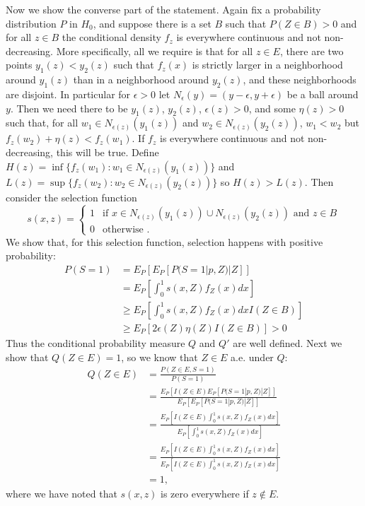 \documentclass{article}
\begin{document}
\begin{appendix}
Now we show the converse part of the statement. Again fix a probability distribution $P$ in $H_0$, and suppose there is a set $B$ such that $P(Z \in B)> 0$ and for all $z \in B$ the conditional density $f_{z}$ is everywhere continuous and not non-decreasing. More specifically, all we require is that for all $z\in E$, there are two points $y_1(z) < y_2(z)$ such that $f_{z}(x)$ is strictly larger in a neighborhood around $y_1(z)$ than in a neighborhood around $y_2(z)$, and these neighborhoods are disjoint. In particular for $\epsilon > 0$ let $N_{\epsilon}(y) = (y - \epsilon, y + \epsilon )$ be a ball around $y$. Then we need there to be $y_1(z)$, $y_2(z)$, $\epsilon(z) > 0$, and some $\eta(z) > 0$ such that, for all $w_1 \in N_{\epsilon(z)}(y_1(z))$ and $w_2 \in N_{\epsilon(z)}(y_2(z))$, $w_1  < w_2$ but $f_{z}(w_2) + \eta(z) < f_{z}(w_1) $. If $f_z$ is everywhere continuous and not non-decreasing, this will be true. Define $H(z) = \inf \{f_{z}(w_1): w_1 \in N_{\epsilon(z)}(y_1(z))\}$ and  $L(z) = \sup \{f_{z}(w_2): w_2 \in N_{\epsilon(z)}(y_2(z))\}$ so $H(z)  > L(z)$. Then consider the selection function 
\begin{equation*}
s(x, z)= \begin{cases}
1 &\text{if } x \in N_{\epsilon(z)}(y_1(z)) \cup N_{\epsilon(z)}(y_2(z)) \text{ and } z \in B \\
0 &\text{otherwise }.
\end{cases}
\end{equation*}
We show that, for this selection function, selection happens with positive probability:
\begin{align*}
    P(S = 1) &= E_P[E_P[ P(S = 1 | p, Z) | Z ]] \\
             &= E_P[\int_0^1 s(x, Z)f_Z(x) dx]\\
             &\geq E_P[\int_0^1 s(x, Z) f_Z(x)dx I(Z \in B)]\\
             & \geq E_P[2\epsilon(Z)\eta(Z)I(Z \in B)] > 0
\end{align*}
Thus the conditional probability measure $Q$ and $Q'$ are well defined. Next we show that $Q(Z \in E) = 1$, so we know that $Z \in E$ a.e. under $Q$:
\begin{align*}
    Q(Z \in E) &= \frac{P(Z \in E, S=1)}{P(S=1)}\\
               &= \frac{E_P[I(Z \in E) E_P[ P(S=1 | p, Z)| Z]] }{E_P[E_P[P(S=1| p, Z) | Z] ]}\\
               &= \frac{E_P[ I(Z \in E) \int_0^1 s(x, Z) f_Z(x) dx ] }{E_P[\int_0^1 s(x, Z) f_Z(x) dx ]}\\
               &= \frac{E_P[ I(Z \in E) \int_0^1 s(x, Z) f_Z(x) dx ] }{E_P[ I(Z \in E) \int_0^1 s(x, Z) f_Z(x) dx ]}\\
               &= 1,
\end{align*}
where we have noted that $s(x, z)$ is zero everywhere if $z \not \in E$. 


\end{appendix}
\end{document}
